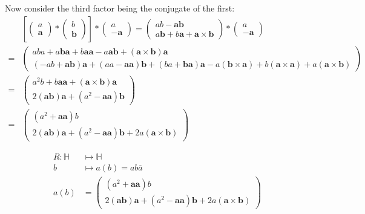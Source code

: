 \documentclass[11pt]{article}
\newcommand{\vvv}[1]{\ensuremath{\begin{pmatrix}#1\end{pmatrix}}}
\begin{document}
Now consider the third factor being the conjugate of the first:
\begin{equation}
    \begin{aligned}
        &[\vvv{a \\ \mathbf{a}} * \vvv{b \\ \mathbf{b}}] * \vvv{a \\ -\mathbf{a}} = 
        \vvv{ab - \mathbf{a} \mathbf{b} \\ a\mathbf{b} + b\mathbf{a} + \mathbf{a} \times \mathbf{b}} *  
        \vvv{a \\ -\mathbf{a}} \\ =
        &\vvv{
            aba + a\mathbf{b}\mathbf{a} + b\mathbf{a}\mathbf{a} - 
            a\mathbf{a}\mathbf{b} + (\mathbf{a} \times \mathbf{b})\mathbf{a} \\
            (-ab + \mathbf{a}\mathbf{b})\mathbf{a} +
            (aa - \mathbf{a}\mathbf{a})\mathbf{b} +
            (ba + \mathbf{b}\mathbf{a})\mathbf{a} -
            a(\mathbf{b} \times \mathbf{a}) +
            b(\mathbf{a} \times \mathbf{a}) +
            a(\mathbf{a} \times \mathbf{b})
        } \\ =
        &\vvv{
            a^2b + b\mathbf{a}\mathbf{a} + (\mathbf{a} \times \mathbf{b})\mathbf{a} \\
            2(\mathbf{a}\mathbf{b})\mathbf{a} + (a^2 - \mathbf{a}\mathbf{a})\mathbf{b}
        } \\ =
        & \vvv{
            (a^2 + \mathbf{a}\mathbf{a})b \\
            2(\mathbf{a}\mathbf{b})\mathbf{a} 
            + (a^2 - \mathbf{a}\mathbf{a})\mathbf{b}
            + 2a(\mathbf{a} \times \mathbf{b})
        }
    \end{aligned}
\end{equation}

\begin{equation}
    \begin{aligned}
        R \colon \mathbb{H} &\mapsto \mathbb{H} \\
        b &\mapsto a(b) = ab\overline{a} \\
        a(b) &= \vvv{
            (a^2 + \mathbf{a}\mathbf{a})b \\
            2(\mathbf{a}\mathbf{b})\mathbf{a} 
            + (a^2 - \mathbf{a}\mathbf{a})\mathbf{b}
            + 2a(\mathbf{a} \times \mathbf{b})
        }
    \end{aligned}   
\end{equation}
\end{document}
